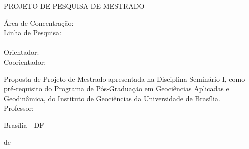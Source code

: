 \begin{center}
	\MakeUppercase{Projeto de Pesquisa de Mestrado \\
	\titulonome}
\end{center}

\vspace{1cm}	

\begin{center}
	Área de Concentração: \areanome \\
	Linha de Pesquisa: \linhapesquisanome \\
	\candidatonome \\
	Orientador: \orientadornome \\
	Coorientador: \coorientadornome \\
\end{center}

\vspace{1cm}

\hfill \parbox{8.5cm} {\noindent Proposta de Projeto de Mestrado apresentada na Disciplina Seminário I, como pré-requisito do Programa de Pós-Graduação em Geociências Aplicadas e Geodinâmica, do Instituto de Geociências da Universidade de Brasília. \\
Professor: \professordisciplinanome
}
\vfill

\vspace{1cm}

\begin{center}
Brasília - DF

\mes de \ano
\end{center}

\clearpage
\setcounter{page}{1}
